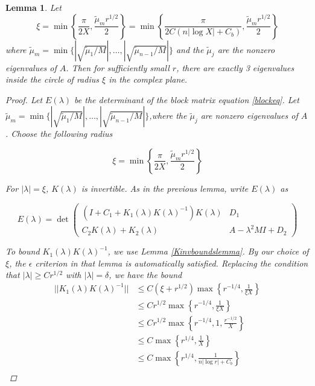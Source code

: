 \documentclass[12pt]{article}
\newtheorem{lemma}{Lemma}
\begin{document}
\begin{lemma}\label{eigcount2}
Let 
\begin{equation}
\xi = \min\left\{ \frac{\pi}{2X}, \frac{\tilde{\mu}_m r^{1/2}}{2} \right\} = 
\min\left\{ \frac{\pi}{2 C( n |\log X| + C_b)}, \frac{\tilde{\mu}_m r^{1/2}}{2} \right\} 
\end{equation}
where $\tilde{\mu}_m = \min \{ |\sqrt{\tilde{\mu}_1/M}|, \dots, |\sqrt{\tilde{\mu}_{n-1}/M}| \}$ and the $\tilde{\mu}_j$ are the nonzero eigenvalues of $A$. Then for sufficiently small $r$, there are exactly 3 eigenvalues inside the circle of radius $\xi$ in the complex plane.

\begin{proof}
Let $E(\lambda)$ be the determinant of the block matrix equation \ref{blockeq}. Let $\tilde{\mu}_m = \min \{ |\sqrt{\tilde{\mu}_1/M}|, \dots, |\sqrt{\tilde{\mu}_{n-1}/M}| \}$,where the $\tilde{\mu}_j$ are nonzero eigenvalues of $A$. Choose the following radius

\[
\xi = \min\left\{ \frac{\pi}{2X}, \frac{\tilde{\mu}_m r^{1/2}}{2} \right\}
\]

For $|\lambda| = \xi$, $K(\lambda)$ is invertible. As in the previous lemma, write $E(\lambda)$ as

\begin{equation*}
E(\lambda) = \det 
\begin{pmatrix}
(I + C_1 + K_1(\lambda)K(\lambda)^{-1})K(\lambda) & D_1 \\
C_2 K(\lambda) + K_2(\lambda) & A - \lambda^2 MI + D_2
\end{pmatrix}
\end{equation*}

To bound $K_1(\lambda)K(\lambda)^{-1}$, we use Lemma \ref{Kinvboundslemma}. By our choice of $\xi$, the $\epsilon$ criterion in that lemma is automatically satisfied. Replacing the condition that $|\lambda| \geq C r^{1/2}$ with $|\lambda| = \delta$, we have the bound
\begin{align*}
||K_1(\lambda)K(\lambda)^{-1}|| &\leq C( \xi + r^{1/2})\max\left\{ r^{-1/4}, \frac{1}{\xi X} \right\} \\
&\leq C r^{1/2} \max\left\{ r^{-1/4}, \frac{1}{\xi X} \right\} \\
&\leq C r^{1/2} \max\left\{ r^{-1/4}, 1, \frac{r^{-1/2}}{X} \right\} \\
&\leq C \max\left\{ r^{1/4}, \frac{1}{X} \right\} \\
&\leq C \max\left\{ r^{1/4}, \frac{1}{n|\log r| + C_b } \right\} \\
\end{align*}


\end{proof}
\end{lemma}
\end{document}
